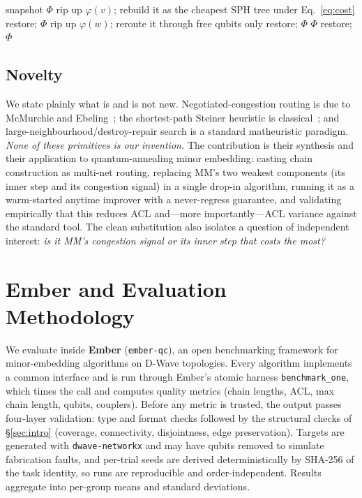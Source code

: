 \documentclass[acmsmall,anonymous,nonacm]{acmart}
\begin{document}
\begin{algorithm}[t]
\caption{\textsc{TryShorten}$(\Phi, v)$ --- one LNS destroy-repair move}
\label{alg:move}
\begin{algorithmic}[1]
\State snapshot $\Phi$
\State rip up $\varphi(v)$; rebuild it as the cheapest SPH tree under
       Eq.~\eqref{eq:cost} 
 restore; \Return $\Phi$ \EndIf
{}
   \State rip up $\varphi(w)$; reroute it through free qubits only
    restore; \Return $\Phi$ \EndIf
\EndFor
{} \Return $\Phi$
\Else{} restore; \Return $\Phi$ \EndIf
\end{algorithmic}
\end{algorithm}

\subsection{Novelty}
\label{sec:novelty}
We state plainly what is and is not new. Negotiated-congestion routing is due to
McMurchie and Ebeling~\cite{mcmurchie1995pathfinder}; the shortest-path Steiner
heuristic is classical~\cite{takahashi1980sph,mehlhorn1988steiner}; and
large-neighbourhood/destroy-repair search is a standard matheuristic paradigm.
\emph{None of these primitives is our invention.} The contribution is their
synthesis and their application to quantum-annealing minor embedding: casting
chain construction as multi-net routing, replacing MM's two weakest components
(its inner step and its congestion signal) in a single drop-in algorithm,
running it as a warm-started anytime improver with a never-regress guarantee, and
validating empirically that this reduces ACL and---more importantly---ACL
variance against the standard tool. The clean substitution also isolates a
question of independent interest: \emph{is it MM's congestion signal or its
inner step that costs the most?}

\section{Ember and Evaluation Methodology}
\label{sec:ember}

We evaluate inside \textbf{Ember} (\texttt{ember-qc}), an open benchmarking
framework for minor-embedding algorithms on D-Wave topologies. Every algorithm
implements a common interface and is run through Ember's atomic harness
\texttt{benchmark\_one}, which times the call and computes quality metrics
(chain lengths, ACL, max chain length, qubits, couplers). Before any metric is
trusted, the output passes four-layer validation: type and format checks
followed by the structural checks of \S\ref{sec:intro} (coverage, connectivity,
disjointness, edge preservation). Targets are generated with
\texttt{dwave-networkx} and may have qubits removed to simulate fabrication
faults, and per-trial seeds are derived deterministically by SHA-256 of the task
identity, so runs are reproducible and order-independent. Results aggregate into
per-group means and standard deviations.
\end{document}
